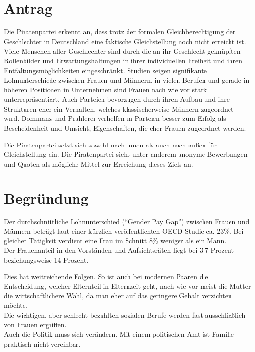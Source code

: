 \section{Antrag}

Die Piratenpartei erkennt an, dass trotz der formalen Gleichberechtigung der Geschlechter in Deutschland eine faktische Gleichstellung noch nicht erreicht ist. Viele Menschen aller Geschlechter sind durch die an ihr Geschlecht geknüpften Rollenbilder und Erwartungshaltungen in ihrer individuellen Freiheit und ihren Entfaltungsmöglichkeiten eingeschränkt. Studien zeigen signifikante Lohnunterschiede zwischen Frauen und Männern, in vielen Berufen und gerade in höheren Positionen in Unternehmen sind Frauen nach wie vor stark unterrepräsentiert. Auch Parteien bevorzugen durch ihren Aufbau und ihre Strukturen eher ein Verhalten, welches klassischerweise Männern zugeordnet wird. Dominanz und Prahlerei verhelfen in Parteien besser zum Erfolg als Bescheidenheit und Umsicht, Eigenschaften, die eher Frauen zugeordnet werden.

Die Piratenpartei setzt sich sowohl nach innen als auch nach außen für Gleichstellung ein. Die Piratenpartei sieht unter anderem anonyme Bewerbungen und Quoten als mögliche Mittel zur Erreichung dieses Ziels an.

\section{Begründung}

Der durchschnittliche Lohnunterschied (``Gender Pay Gap'') zwischen Frauen und Männern beträgt laut einer kürzlich veröffentlichten OECD-Studie ca. 23\%. Bei gleicher Tätigkeit verdient eine Frau im Schnitt 8\% weniger als ein Mann. \\Der Frauenanteil in den Vorständen und Aufsichtsräten liegt bei 3,7 Prozent beziehungsweise 14 Prozent.

Dies hat weitreichende Folgen. So ist auch bei modernen Paaren die Entscheidung, welcher Elternteil in Elternzeit geht, nach wie vor meist die Mutter die wirtschaftlichere Wahl, da man eher auf das geringere Gehalt verzichten möchte.\\Die wichtigen, aber schlecht bezahlten sozialen Berufe werden fast ausschließlich von Frauen ergriffen. \\Auch die Politik muss sich verändern. Mit einem politischen Amt ist Familie praktisch nicht vereinbar.

